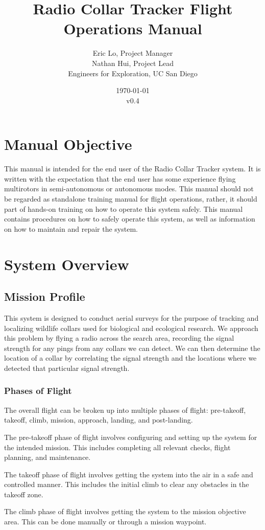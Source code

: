 \documentclass{report}
\title{Radio Collar Tracker Flight Operations Manual}
\author{Eric Lo, Project Manager\\Nathan Hui, Project Lead\\Engineers for Exploration, UC San Diego}
\date{\today\\v0.4}
\begin{document}
\maketitle
\tableofcontents
\chapter{Manual Objective}
	This manual is intended for the end user of the Radio Collar Tracker system.  It is written with the expectation that the end user has some experience flying \glspl{multirotor} in semi-autonomous or autonomous modes.  This manual should not be regarded as standalone training manual for flight operations, rather, it should part of hands-on training on how to operate this system safely.  This manual contains procedures on how to safely operate this system, as well as information on how to maintain and repair the system.
\chapter{System Overview}
	\section{Mission Profile}
		This system is designed to conduct aerial surveys for the purpose of tracking and localizing wildlife collars used for biological and ecological research.  We approach this problem by flying a radio across the search area, recording the signal strength for any pings from any collars we can detect.  We can then determine the location of a collar by correlating the signal strength and the locations where we detected that particular signal strength.

		\subsection{Phases of Flight}
			The overall flight can be broken up into multiple phases of flight: pre-takeoff, takeoff, climb, mission, approach, landing, and post-landing.

			The pre-takeoff phase of flight involves configuring and setting up the system for the intended mission.  This includes completing all relevant checks, flight planning, and maintenance.

			The takeoff phase of flight involves getting the system into the air in a safe and controlled manner.  This includes the initial climb to clear any obstacles in the takeoff zone.

			The climb phase of flight involves getting the system to the mission objective area.  This can be done manually or through a mission waypoint.
\end{document}
